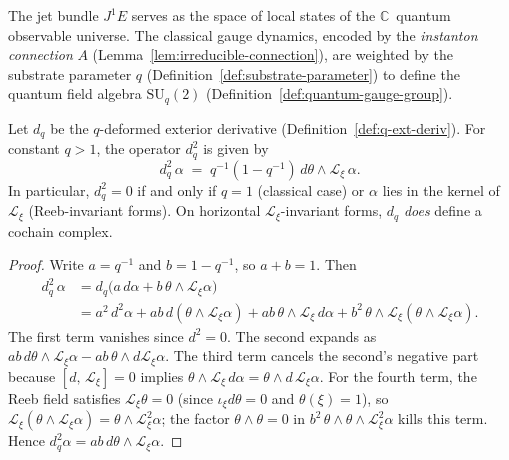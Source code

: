 
\begin{remark}
\label{rem:j1e-local-states}
The jet bundle $J^1 E$ serves as the space of local states of the
$\mathbb{C}$~quantum observable universe.  The classical gauge dynamics,
encoded by the \emph{instanton connection} $A$
(Lemma~\ref{lem:irreducible-connection}), are weighted by the substrate
parameter $q$ (Definition~\ref{def:substrate-parameter}) to define the
quantum field algebra $\mathrm{SU}_q(2)$
(Definition~\ref{def:quantum-gauge-group}).
\end{remark}

\begin{proposition}
\label{prop:dq-squared}
Let $d_q$ be the $q$-deformed exterior derivative
(Definition~\ref{def:q-ext-deriv}).  For constant $q > 1$, the operator
$d_q^2$ is given by
\[
  d_q^2\,\alpha
  \;=\; q^{-1}(1 - q^{-1})\,d\theta \wedge \mathcal{L}_\xi\,\alpha.
\]
In particular, $d_q^2 = 0$ if and only if $q = 1$ (classical case) or
$\alpha$ lies in the kernel of $\mathcal{L}_\xi$ (Reeb-invariant forms).
On horizontal $\mathcal{L}_\xi$-invariant forms, $d_q$ \emph{does}
define a cochain complex.
\end{proposition}

\begin{proof}
Write $a = q^{-1}$ and $b = 1 - q^{-1}$, so $a + b = 1$.  Then
\begin{align*}
  d_q^2\,\alpha
  &= d_q\bigl(a\,d\alpha + b\,\theta \wedge \mathcal{L}_\xi\alpha\bigr) \\
  &= a^2\,d^2\alpha
     + ab\,d(\theta \wedge \mathcal{L}_\xi\alpha)
     + ab\,\theta \wedge \mathcal{L}_\xi\,d\alpha
     + b^2\,\theta \wedge \mathcal{L}_\xi(\theta \wedge \mathcal{L}_\xi\alpha).
\end{align*}
The first term vanishes since $d^2 = 0$.  The second expands as
$ab\,d\theta \wedge \mathcal{L}_\xi\alpha
- ab\,\theta \wedge d\mathcal{L}_\xi\alpha$.
The third term cancels the second's negative part because
$[d,\, \mathcal{L}_\xi] = 0$ implies
$\theta \wedge \mathcal{L}_\xi\,d\alpha
= \theta \wedge d\,\mathcal{L}_\xi\alpha$.
For the fourth term, the Reeb field satisfies
$\mathcal{L}_\xi\theta = 0$ (since $\iota_\xi d\theta = 0$ and
$\theta(\xi)=1$), so
$\mathcal{L}_\xi(\theta \wedge \mathcal{L}_\xi\alpha)
= \theta \wedge \mathcal{L}_\xi^2\alpha$;
the factor $\theta \wedge \theta = 0$ in $b^2\,\theta \wedge \theta
\wedge \mathcal{L}_\xi^2\alpha$ kills this term.  Hence
$d_q^2\alpha = ab\,d\theta \wedge \mathcal{L}_\xi\alpha$.
\end{proof}

